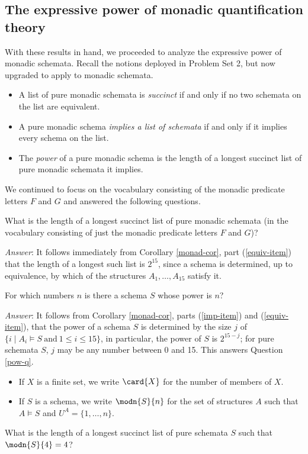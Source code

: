 \subsection{The expressive power of monadic quantification theory}

With these results in hand, we proceeded to analyze the expressive power of monadic schemata. Recall the notions deployed in Problem Set 2, but now upgraded to apply to monadic schemata. 
\begin{itemize}
\item 
A list of pure monadic schemata is \textit{succinct} if and only if no two schemata on the list are equivalent. 
\item 
A pure monadic schema \textit{implies a list of schemata} if and only if it implies every schema on the list.
\item The \textit{power} of a pure monadic schema is the length of a longest succinct list of pure monadic schemata it implies.  
\end{itemize}
We continued to focus on the vocabulary consisting of the monadic predicate letters $F$ and $G$ and answered the following questions.
\begin{question}\label{succinct-q}
What is the length of a longest succinct list of pure monadic schemata (in the vocabulary consisting of just the monadic predicate letters $F$ and $G$)?
\end{question}
\emph{Answer}:
It follows immediately from Corollary \ref{monad-cor}, part (\ref{equiv-item}) that the length of a longest such list is $2^{15}$, since a schema is determined, up to equivalence, by which of the structures $A_1,\ldots,A_{15}$ satisfy it.
\begin{question}\label{pow-q}
For which numbers $n$ is there a schema $S$ whose power is $n$?
\end{question}
\emph{Answer}:
It follows from Corollary \ref{monad-cor}, parts (\ref{imp-item}) and (\ref{equiv-item}), that the power of a schema $S$ is determined by the size $j$ of $\{i\mid A_i\models S\ \mbox{and}\ 1\leq i\leq 15\}$, in particular, the power of $S$ is $2^{15-j}$; for pure schemata $S$, $j$ may be any number between 0 and 15. This answers Question \ref{pow-q}.

\begin{definition}
\begin{itemize}
\item
If $X$ is a finite set, we write $\card{X}$ for the number of members of $X$.
\item
If $S$ is a schema, we write $\modn{S}{n}$ for the set of structures $A$ such that $A\models S$ and $U^A=\{1,\ldots, n\}.$
\end{itemize}
\end{definition}
\begin{question}\label{mspec-q}
What is the length of a longest succinct list of pure schemata $S$ such that $\modn{S}{4}=4$?
\end{question}

